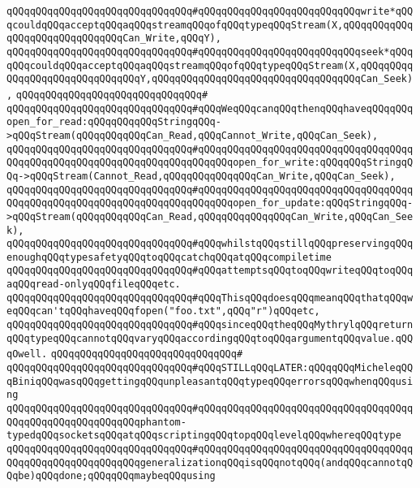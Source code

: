 \verb|qQQqqQQqqQQqqQQqqQQqqQQqqQQqqQQq#qQQqqQQqqQQqqQQqqQQqqQQqqQQqwrite*qQQqcouldqQQqacceptqQQqaqQQqstreamqQQqofqQQqtypeqQQqStream(X,qQQqqQQqqQQqqQQqqQQqqQQqqQQqqQQqCan_Write,qQQqY),|\newline
\verb|qQQqqQQqqQQqqQQqqQQqqQQqqQQqqQQq#qQQqqQQqqQQqqQQqqQQqqQQqqQQqseek*qQQqqQQqcouldqQQqacceptqQQqaqQQqstreamqQQqofqQQqtypeqQQqStream(X,qQQqqQQqqQQqqQQqqQQqqQQqqQQqqQQqY,qQQqqQQqqQQqqQQqqQQqqQQqqQQqqQQqqQQqCan_Seek),|\newline
\verb|qQQqqQQqqQQqqQQqqQQqqQQqqQQqqQQq#|\newline
\verb|qQQqqQQqqQQqqQQqqQQqqQQqqQQqqQQq#qQQqWeqQQqcanqQQqthenqQQqhaveqQQqqQQqopen_for_read:qQQqqQQqqQQqStringqQQq->qQQqStream(qQQqqQQqqQQqCan_Read,qQQqCannot_Write,qQQqCan_Seek),|\newline
\verb|qQQqqQQqqQQqqQQqqQQqqQQqqQQqqQQq#qQQqqQQqqQQqqQQqqQQqqQQqqQQqqQQqqQQqqQQqqQQqqQQqqQQqqQQqqQQqqQQqqQQqqQQqqQQqopen_for_write:qQQqqQQqStringqQQq->qQQqStream(Cannot_Read,qQQqqQQqqQQqqQQqCan_Write,qQQqCan_Seek),|\newline
\verb|qQQqqQQqqQQqqQQqqQQqqQQqqQQqqQQq#qQQqqQQqqQQqqQQqqQQqqQQqqQQqqQQqqQQqqQQqqQQqqQQqqQQqqQQqqQQqqQQqqQQqqQQqqQQqopen_for_update:qQQqStringqQQq->qQQqStream(qQQqqQQqqQQqCan_Read,qQQqqQQqqQQqqQQqCan_Write,qQQqCan_Seek),|\newline
\verb|qQQqqQQqqQQqqQQqqQQqqQQqqQQqqQQq#qQQqwhilstqQQqstillqQQqpreservingqQQqenoughqQQqtypesafetyqQQqtoqQQqcatchqQQqatqQQqcompiletime|\newline
\verb|qQQqqQQqqQQqqQQqqQQqqQQqqQQqqQQq#qQQqattemptsqQQqtoqQQqwriteqQQqtoqQQqaqQQqread-onlyqQQqfileqQQqetc.|\newline
\verb|qQQqqQQqqQQqqQQqqQQqqQQqqQQqqQQq#qQQqThisqQQqdoesqQQqmeanqQQqthatqQQqweqQQqcan'tqQQqhaveqQQqfopen("foo.txt",qQQq"r")qQQqetc,|\newline
\verb|qQQqqQQqqQQqqQQqqQQqqQQqqQQqqQQq#qQQqsinceqQQqtheqQQqMythrylqQQqreturnqQQqtypeqQQqcannotqQQqvaryqQQqaccordingqQQqtoqQQqargumentqQQqvalue.qQQqOwell.|\newline
\verb|qQQqqQQqqQQqqQQqqQQqqQQqqQQqqQQq#|\newline
\verb|qQQqqQQqqQQqqQQqqQQqqQQqqQQqqQQq#qQQqSTILLqQQqLATER:qQQqqQQqMicheleqQQqBiniqQQqwasqQQqgettingqQQqunpleasantqQQqtypeqQQqerrorsqQQqwhenqQQqusing|\newline
\verb|qQQqqQQqqQQqqQQqqQQqqQQqqQQqqQQq#qQQqqQQqqQQqqQQqqQQqqQQqqQQqqQQqqQQqqQQqqQQqqQQqqQQqqQQqqQQqphantom-typedqQQqsocketsqQQqatqQQqscriptingqQQqtopqQQqlevelqQQqwhereqQQqtype|\newline
\verb|qQQqqQQqqQQqqQQqqQQqqQQqqQQqqQQq#qQQqqQQqqQQqqQQqqQQqqQQqqQQqqQQqqQQqqQQqqQQqqQQqqQQqqQQqqQQqgeneralizationqQQqisqQQqnotqQQq(andqQQqcannotqQQqbe)qQQqdone;qQQqqQQqmaybeqQQqusing|\newline
